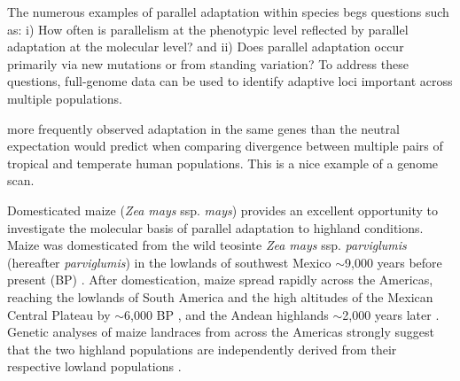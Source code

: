 %
%
The numerous examples of parallel adaptation within species begs questions such as: 
i) How often is parallelism at the phenotypic level reflected by parallel adaptation at the molecular level? and 
ii) Does parallel adaptation occur primarily via new mutations or from standing variation?
To address these questions, full-genome data can be used to identify adaptive loci important across multiple populations.

\cite{Tennessen_2011_21698142} more frequently observed adaptation in the same genes than the neutral expectation would predict when comparing divergence between multiple pairs of tropical and temperate human populations.  This is a nice example of a genome scan. 

Domesticated maize (\emph{Zea mays} ssp. \emph{mays}) provides an excellent opportunity to investigate the molecular basis of parallel adaptation to highland conditions.  Maize was domesticated from the wild teosinte \emph{Zea mays} ssp. \emph{parviglumis} (hereafter \emph{parviglumis}) in the lowlands of southwest Mexico $\sim$9,000 years before present (BP) \cite[]{Matsuoka_2002_11983901,Piperno_2009_19307570,vanHeerwaarden_2011_21189301}. After domestication, maize spread rapidly across the Americas, reaching the lowlands of South America and the high altitudes of the Mexican Central Plateau by $\sim$6,000 BP \cite[]{Piperno_2006_69}, and the Andean highlands $\sim$2,000 years later \cite[]{Perry_2006_16511492,Grobman_2012_22307642}. Genetic analyses of maize landraces from across the Americas strongly suggest that the two highland populations are independently derived from their respective lowland populations \cite[]{Vigouroux_2008_21632329, vanHeerwaarden_2011_21189301}. 

